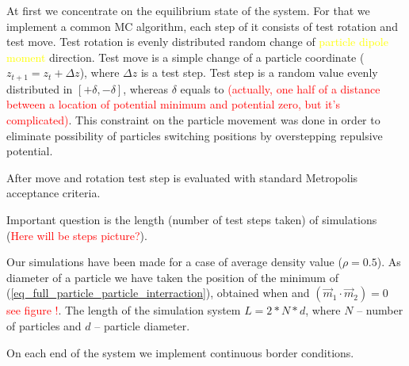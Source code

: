 \documentclass[12pt,a4paper]{article}
\begin{document}
At first we concentrate on the equilibrium state of the system. For that we implement a common MC algorithm, each step of it consists of test rotation and test move. Test rotation is evenly distributed random change of \textcolor{yellow}{particle dipole moment} direction. Test move is a simple change of a particle coordinate ($z_{t+1} = z_t + \Delta z$), where $\Delta z$ is a test step. Test step is a random value evenly distributed in $[+\delta, -\delta]$, whereas $\delta$ equals to \textcolor{red}{(actually, one half of a distance between a location of potential minimum and potential zero, but it's complicated)}. This constraint on the particle movement was done in order to eliminate possibility of particles switching positions by overstepping repulsive potential.

After move and rotation test step is evaluated with standard Metropolis acceptance criteria.

Important question is the length (number of test steps taken) of simulations (\textcolor{red}{Here will be steps picture?}).

Our simulations have been made for a case of average density value ($\rho = 0.5$). As diameter of a particle we have taken the position of the minimum of (\ref{eq_full_particle_particle_interraction}), obtained when and $(\vec{m}_1 \cdot \vec{m}_2) = 0$ \textcolor{red}{see figure !}. The length of the simulation system $L = 2*N*d$, where $N$ -- number of particles and $d$ -- particle diameter.

On each end of the system we implement continuous border conditions.



\end{document}

